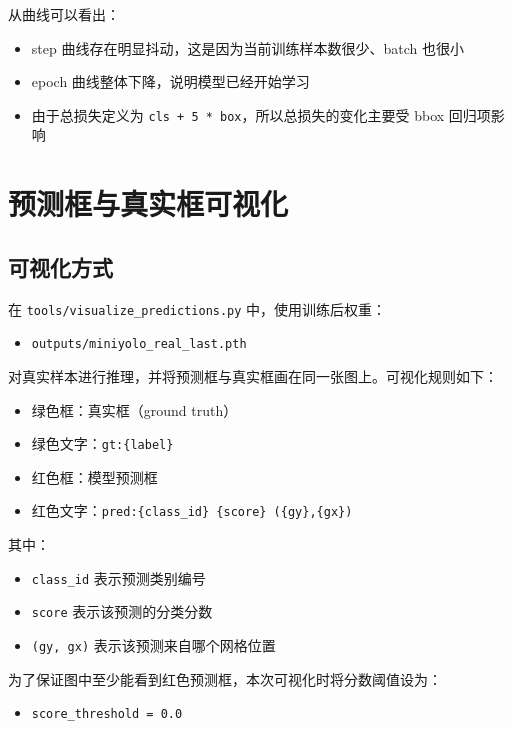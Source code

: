 \documentclass[11pt,a4paper]{article}
\begin{document}
从曲线可以看出：

\begin{itemize}
  \item step 曲线存在明显抖动，这是因为当前训练样本数很少、batch 也很小
  \item epoch 曲线整体下降，说明模型已经开始学习
  \item 由于总损失定义为 \texttt{cls + 5 * box}，所以总损失的变化主要受 bbox 回归项影响
\end{itemize}

\section{预测框与真实框可视化}

\subsection{可视化方式}

在 \texttt{tools/visualize\_predictions.py} 中，使用训练后权重：

\begin{itemize}
  \item \texttt{outputs/miniyolo\_real\_last.pth}
\end{itemize}

对真实样本进行推理，并将预测框与真实框画在同一张图上。可视化规则如下：

\begin{itemize}
  \item 绿色框：真实框（ground truth）
  \item 绿色文字：\texttt{gt:\{label\}}
  \item 红色框：模型预测框
  \item 红色文字：\texttt{pred:\{class\_id\} \{score\} (\{gy\},\{gx\})}
\end{itemize}

其中：

\begin{itemize}
  \item \texttt{class\_id} 表示预测类别编号
  \item \texttt{score} 表示该预测的分类分数
  \item \texttt{(gy, gx)} 表示该预测来自哪个网格位置
\end{itemize}

为了保证图中至少能看到红色预测框，本次可视化时将分数阈值设为：

\begin{itemize}
  \item \texttt{score\_threshold = 0.0}
\end{itemize}
\end{document}
